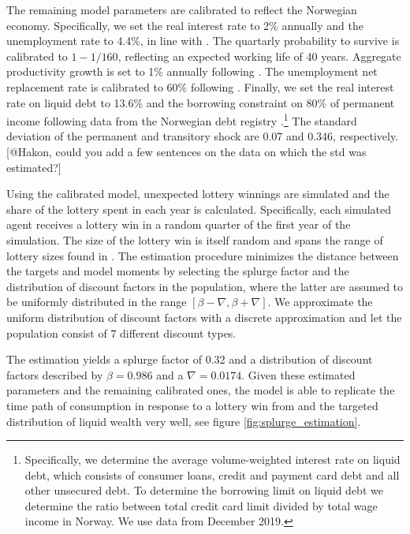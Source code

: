 \documentclass[11pt]{article}
\begin{document}
	The remaining model parameters are calibrated to reflect the Norwegian economy. Specifically, we set the real interest rate to 2\% annually and the unemployment rate to 4.4\%, in line with \citet{aursland_state-dependent_2020}. The quartarly probability to survive is calibrated to $1-1/160$, reflecting an expected working life of 40 years. Aggregate productivity growth is set to 1\% annually following \citet{kravik_navigating_2019}. The unemployment net replacement rate is calibrated to 60\% following \citet{oecd_net_2020}. Finally, we set the real interest rate on liquid debt to 13.6\% and the borrowing constraint on 80\% of permanent income following data from the Norwegian debt registry \citet{gjeldsregistret_nokkeltall_2022}.\footnote{Specifically, we determine the average volume-weighted interest rate on liquid debt, which consists of consumer loans, credit and payment card debt and all other unsecured debt. To determine the borrowing limit on liquid debt we determine the ratio between total credit card limit divided by total wage income in Norway. We use data from December 2019.} The standard deviation of the permanent and transitory shock are 0.07 and 0.346, respectively. [@Hakon, could you add a few sentences on the data on which the std was estimated?]
	
	Using the calibrated model, unexpected lottery winnings are simulated and the share of the lottery spent in each year is calculated. Specifically, each simulated agent receives a lottery win in a random quarter of the first year of the simulation. The size of the lottery win is itself random and spans the range of lottery sizes found in \citet{fagereng_mpc_2021}. The estimation procedure minimizes the distance between the targets and model moments by selecting the splurge factor and the distribution of discount factors in the population, where the latter are assumed to be uniformly distributed in the range $[\beta-\nabla, \beta+\nabla]$. We approximate the uniform distribution of discount factors with a discrete approximation and let the population consist of $7$ different discount types.
	
	The estimation yields a splurge factor of 0.32 and a distribution of discount factors described by $\beta = 0.986$ and a $\nabla=0.0174$. Given these estimated parameters and the remaining calibrated ones, the model is able to replicate the time path of consumption in response to a lottery win from \citet{fagereng_mpc_2021} and the targeted distribution of liquid wealth very well, see figure \ref{fig:splurge_estimation}.
\end{document}
